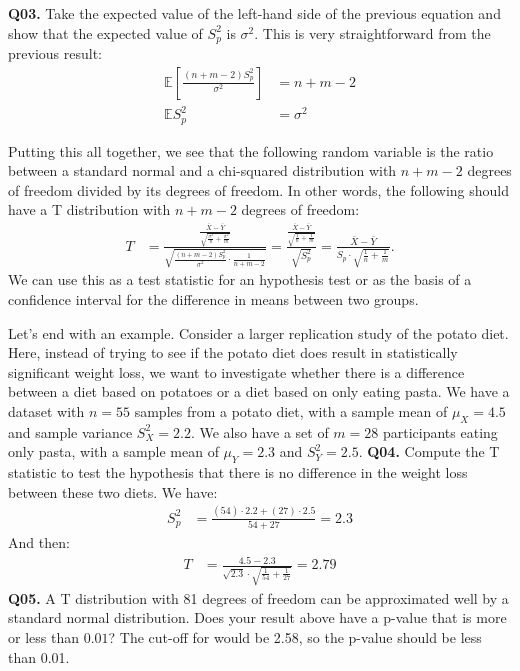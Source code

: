\documentclass[12pt]{article}
\newcommand{\E}{\mathbb{E}}
\newcommand{\cblack}{\color{Black}}
\newcommand{\cblue}{\color{MidnightBlue}}
\begin{document}
\textbf{Q03.} Take the expected value of the left-hand side of the
previous equation and show that the expected value of $S_p^2$ is $\sigma^2$.
\cblue This is very straightforward from the previous result:
\begin{align*}
\E \left[ \frac{(n + m - 2) S_p^2}{\sigma^2} \right] &= n + m - 2 \\
\E S_p^2 &= \sigma^2
\end{align*} \cblack

Putting this all together, we see that the following random variable is
the ratio between a standard normal and a chi-squared distribution with
$n + m - 2$ degrees of freedom divided by its degrees of freedom. In
other words, the following should have a T distribution with $n + m - 2$
degrees of freedom:
\begin{align*}
T &= \frac{\frac{\bar{X} - \bar{Y}}{\sqrt{\frac{\sigma^2}{n} +
  \frac{\sigma^2}{m}}}}{\sqrt{\frac{(n + m - 2)S_p^2}{\sigma^2}\cdot\frac{1}{n + m - 2}}}
= \frac{\frac{\bar{X} - \bar{Y}}{\sqrt{\frac{1}{n} + \frac{1}{m}}}}{\sqrt{S_p^2}}
= \frac{\bar{X} - \bar{Y}}{S_p \cdot \sqrt{\frac{1}{n} + \frac{1}{m}}}.
\end{align*}
We can use this as a test statistic for an hypothesis test or as the basis
of a confidence interval for the difference in means between two groups.

Let's end with an example. Consider a larger replication study of the potato
diet. Here, instead of trying to see if the potato diet does result in 
statistically significant weight loss, we want to investigate whether there
is a difference between a diet based on potatoes or a diet based on only
eating pasta. We have a dataset with $n=55$ samples from a potato diet,
with a sample mean of $\mu_X = 4.5$ and sample variance $S_X^2 = 2.2$. We
also have a set of $m=28$ participants eating only pasta, with a sample mean
of $\mu_Y = 2.3$ and $S_Y^2 = 2.5$. \textbf{Q04.} Compute the T statistic
to test the hypothesis that there is no difference in the weight loss between
these two diets. \cblue We have:
\begin{align*}
S_p^2 &= \frac{(54) \cdot 2.2 + (27) \cdot 2.5}{54 + 27} = 2.3
\end{align*}
And then:
\begin{align*}
T &= \frac{4.5 - 2.3}{\sqrt{2.3} \cdot \sqrt{\frac{1}{54} + \frac{1}{27}}} = 2.79
\end{align*} \cblack
\textbf{Q05.} A T distribution with 81 degrees of freedom can be approximated
well by a standard normal distribution. Does your result above have a p-value 
that is more or less than $0.01$? \cblue The cut-off for would be 2.58, so the
p-value should be less than 0.01. \cblack
\end{document}
